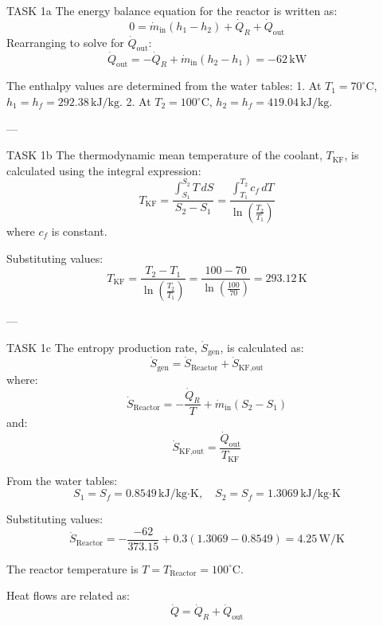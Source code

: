 TASK 1a  
The energy balance equation for the reactor is written as:  
\[
0 = \dot{m}_{\text{in}} (h_1 - h_2) + \dot{Q}_R + \dot{Q}_{\text{out}}
\]  
Rearranging to solve for \( \dot{Q}_{\text{out}} \):  
\[
\dot{Q}_{\text{out}} = -\dot{Q}_R + \dot{m}_{\text{in}} (h_2 - h_1) = -62 \, \text{kW}
\]  

The enthalpy values are determined from the water tables:  
1. At \( T_1 = 70^\circ\text{C} \), \( h_1 = h_f = 292.38 \, \text{kJ/kg} \).  
2. At \( T_2 = 100^\circ\text{C} \), \( h_2 = h_f = 419.04 \, \text{kJ/kg} \).  

---

TASK 1b  
The thermodynamic mean temperature of the coolant, \( T_{\text{KF}} \), is calculated using the integral expression:  
\[
T_{\text{KF}} = \frac{\int_{S_1}^{S_2} T \, dS}{S_2 - S_1} = \frac{\int_{T_1}^{T_2} c_f \, dT}{\ln \left( \frac{T_2}{T_1} \right)}
\]  
where \( c_f \) is constant.  

Substituting values:  
\[
T_{\text{KF}} = \frac{T_2 - T_1}{\ln \left( \frac{T_2}{T_1} \right)} = \frac{100 - 70}{\ln \left( \frac{100}{70} \right)} = 293.12 \, \text{K}
\]  

---

TASK 1c  
The entropy production rate, \( \dot{S}_{\text{gen}} \), is calculated as:  
\[
\dot{S}_{\text{gen}} = \dot{S}_{\text{Reactor}} + \dot{S}_{\text{KF,out}}
\]  
where:  
\[
\dot{S}_{\text{Reactor}} = -\frac{\dot{Q}_R}{T} + \dot{m}_{\text{in}} (S_2 - S_1)
\]  
and:  
\[
\dot{S}_{\text{KF,out}} = \frac{\dot{Q}_{\text{out}}}{T_{\text{KF}}}
\]  

From the water tables:  
\[
S_1 = S_f = 0.8549 \, \text{kJ/kg·K}, \quad S_2 = S_f = 1.3069 \, \text{kJ/kg·K}
\]  

Substituting values:  
\[
\dot{S}_{\text{Reactor}} = -\frac{-62}{373.15} + 0.3 (1.3069 - 0.8549) = 4.25 \, \text{W/K}
\]  

The reactor temperature is \( T = T_{\text{Reactor}} = 100^\circ\text{C} \).  

Heat flows are related as:  
\[
\dot{Q} = \dot{Q}_R + \dot{Q}_{\text{out}}
\]